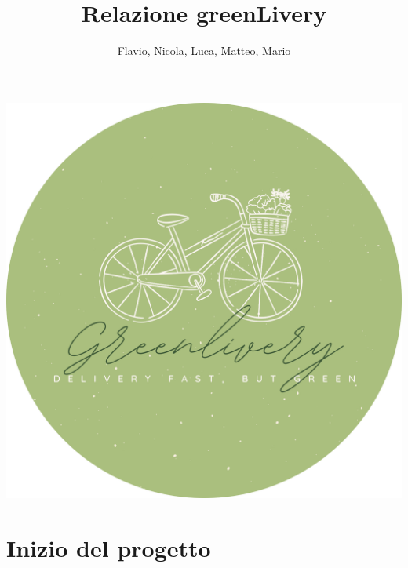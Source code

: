 \documentclass{article}
\begin{document}
\begin{center}
\includegraphics[width=\textwidth]{data/logocircle.png}
\title{Relazione greenLivery}
\author{Flavio, Nicola, Luca, Matteo, Mario}
\end{center}
\renewcommand{\contentsname}{Indice}

\maketitle
\tableofcontents

\section{Inizio del progetto}\par
\end{document}
